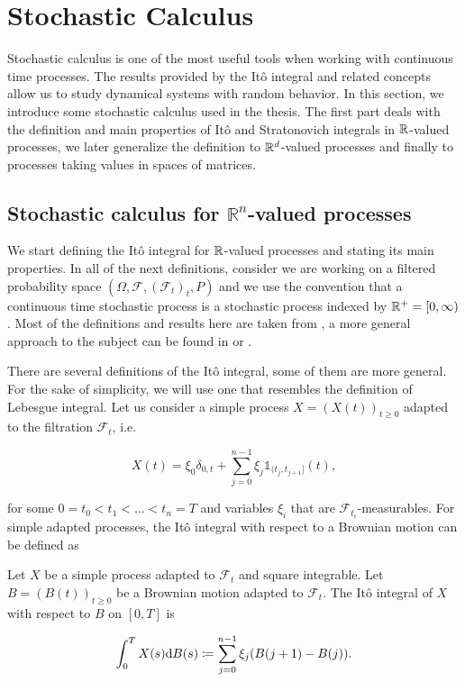 \section{Stochastic Calculus}

Stochastic calculus is one of the most useful tools when working with continuous time processes. The results provided by the Itô integral and related concepts allow us to study dynamical systems with random behavior. In this section, we introduce some stochastic calculus used in the thesis. The first part deals with the definition and main properties of Itô and Stratonovich integrals in $\mathbb R$-valued processes, we later generalize the definition to $\mathbb R^d$-valued processes and finally to processes taking values in spaces of matrices.

\subsection{Stochastic calculus for $\mathbb{R}^n$-valued processes}

We start defining the Itô integral for $\mathbb R$-valued processes and stating its main properties. In all of the next definitions, consider we are working on a filtered probability space $(\Omega, \mathscr F, (\mathscr F_t)_t, P)$ and we use the convention that a continuous time stochastic process is a stochastic process indexed by $\mathbb R^+ = [0,\infty)$. Most of the definitions and results here are taken from \cite{book:klebaner}, a more general approach to the subject can be found in \cite{book:karatzas} or \cite{book:revuzyor}.

There are several definitions of the Itô integral, some of them are more general. For the sake of simplicity, we will use one that resembles the definition of Lebesgue integral. Let us consider a simple process $X = (X(t))_{t\ge0}$ adapted to the filtration $\mathscr F_t$, i.e.

\begin{equation*}
    X(t) = \xi_0\delta_{0,t} + \sum_{j=0}^{n-1}  \xi_j \mathds 1_{(t_j,t_{j+1}]}(t),
\end{equation*}

\noindent for some $0=t_0 < t_1 < \dots < t_n = T$ and variables $\xi_i$ that are $\mathscr F_{t_i}$-measurables. For simple adapted processes, the Itô integral with respect to a Brownian motion can be defined as


\begin{definition} \label{def:itosimple}
    Let $X$ be a simple process adapted to $\mathscr F_t$ and square integrable. Let $B = (B(t))_{t\ge 0}$ be a Brownian motion adapted to $\mathscr F_t$. The Itô integral of $X$ with respect to $B$ on $[0,T]$ is 

    \begin{equation*}
        \int_0^T X(s) \mathrm d B(s) \coloneqq \sum_{j=0}^{n-1} \xi_j(B(j+1) - B(j)).
    \end{equation*}
\end{definition}

